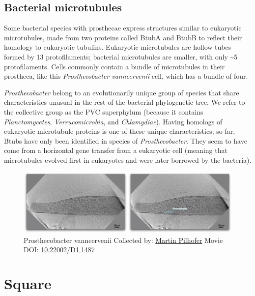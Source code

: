 \documentclass[]{tufte-book}
\begin{document}
\hypertarget{Bacterial_microtubules}{\subsection{Bacterial
microtubules}\label{Bacterial_microtubules}}

Some bacterial species with prosthecae express structures similar to
eukaryotic microtubules, made from two proteins called BtubA and BtubB
to reflect their homology to eukaryotic tubulins. Eukaryotic
microtubules are hollow tubes formed by 13 protofilaments; bacterial
microtubules are smaller, with only \textasciitilde{}5 protofilaments.
Cells commonly contain a bundle of microtubules in their prostheca, like
this \emph{Prosthecobacter vanneervenii} cell, which has a bundle of
four.

\emph{Prosthecobacter} belong to an evolutionarily unique group of
species that share characteristics unusual in the rest of the bacterial
phylogenetic tree. We refer to the collective group as the PVC
superphylum (because it contains \emph{Planctomycetes},
\emph{Verrucomicrobia}, and \emph{Chlamydiae}). Having homologs of
eukaryotic microtubule proteins is one of these unique characteristics;
so far, Btubs have only been identified in species of
\emph{Prosthecobacter}. They seem to have come from a horizontal gene
transfer from a eukaryotic cell (meaning that microtubules evolved first
in eukaryotes and were later borrowed by the bacteria).





\begin{figure}
\includegraphics{movie_stills/3_6a} \caption[Prosthecobacter vanneervenii Collected by:
\protect\hyperlink{martin_pilhofer}{Martin Pilhofer} Movie DOI:
\href{https://doi.org/10.22002/D1.1487}{10.22002/D1.1487}]{Prosthecobacter vanneervenii Collected by:
\protect\hyperlink{martin_pilhofer}{Martin Pilhofer} Movie DOI:
\href{https://doi.org/10.22002/D1.1487}{10.22002/D1.1487}}\label{fig:3-6a}
\end{figure}

\section{Square}\label{square}
\end{document}
